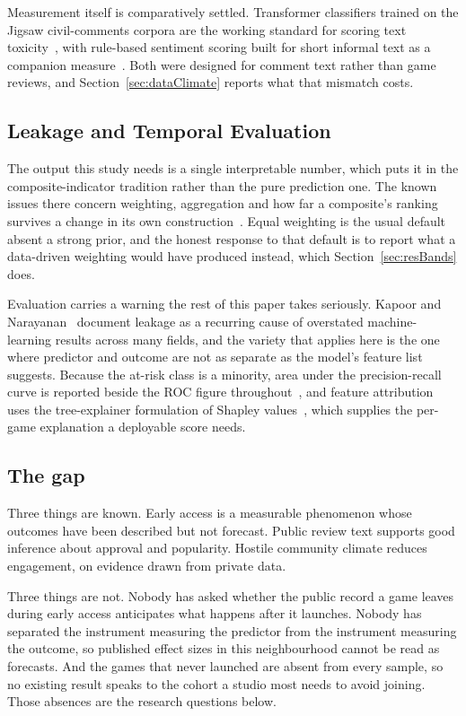 \documentclass[sigconf]{acmart}
\begin{document}
Measurement itself is comparatively settled. Transformer classifiers trained on the Jigsaw
civil-comments corpora are the working standard for scoring text toxicity~\cite{Borkan2019}, with
rule-based sentiment scoring built for short informal text as a companion
measure~\cite{HuttoGilbert2014}. Both were designed for comment text rather than game reviews, and
Section~\ref{sec:dataClimate} reports what that mismatch costs.

\subsection{Leakage and Temporal Evaluation}

The output this study needs is a single interpretable number, which puts it in the
composite-indicator tradition rather than the pure prediction one. The known issues there concern
weighting, aggregation and how far a composite's ranking survives a change in its own
construction~\cite{Greco2018}. Equal weighting is the usual default absent a strong prior, and the
honest response to that default is to report what a data-driven weighting would have produced
instead, which Section~\ref{sec:resBands} does.

Evaluation carries a warning the rest of this paper takes seriously. Kapoor and
Narayanan~\cite{KapoorNarayanan2023} document leakage as a recurring cause of overstated
machine-learning results across many fields, and the variety that applies here is the one where
predictor and outcome are not as separate as the model's feature list suggests. Because the
at-risk class is a minority, area under the precision-recall curve is reported beside the ROC
figure throughout~\cite{SaitoRehmsmeier2015}, and feature attribution uses the tree-explainer
formulation of Shapley values~\cite{Lundberg2020}, which supplies the per-game explanation a
deployable score needs.

\subsection*{The gap}

Three things are known. Early access is a measurable phenomenon whose outcomes have been described
but not forecast. Public review text supports good inference about approval and popularity. Hostile
community climate reduces engagement, on evidence drawn from private data.

Three things are not. Nobody has asked whether the public record a game leaves during early access
anticipates what happens after it launches. Nobody has separated the instrument measuring the
predictor from the instrument measuring the outcome, so published effect sizes in this
neighbourhood cannot be read as forecasts. And the games that never launched are absent from every
sample, so no existing result speaks to the cohort a studio most needs to avoid joining. Those
absences are the research questions below.
\end{document}

